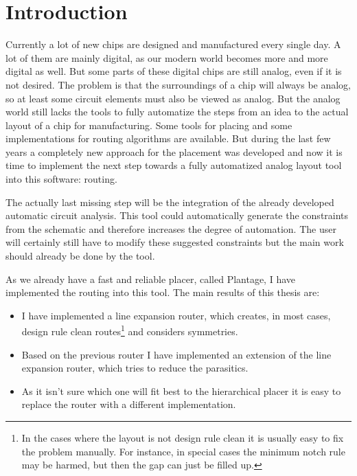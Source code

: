 \chapter{Introduction}

Currently a lot of new chips are designed and manufactured every single day. A lot of them are mainly digital, as our modern world becomes more and more digital as well. But some parts of these digital chips are still analog, even if it is not desired. The problem is that the surroundings of a chip will always be analog, so at least some circuit elements must also be viewed as analog. But the analog world still lacks the tools to fully automatize the steps from an idea to the actual layout of a chip for manufacturing. Some tools for placing and some implementations for routing algorithms are available. But during the last few years a completely new approach for the placement was developed and now it is time to implement the next step towards a fully automatized analog layout tool into this software: routing.

The actually last missing step will be the integration of the already developed automatic circuit analysis. This tool could automatically generate the constraints from the schematic and therefore increases the degree of automation. The user will certainly still have to modify these suggested constraints but the main work should already be done by the tool.

As we already have a fast and reliable placer, called Plantage, I have implemented the routing into this tool. The main results of this thesis are:
\begin{itemize}
\item I have implemented a line expansion router, which creates, in most cases, design rule clean routes\footnote{\label{foot:1}In the cases where the layout is not design rule clean it is usually easy to fix the problem manually. For instance, in special cases the minimum notch rule may be harmed, but then the gap can just be filled up.} and considers symmetries.
\item Based on the previous router I have implemented an extension of the line expansion router, which tries to reduce the parasitics.
\item As it isn't sure which one will fit best to the hierarchical placer it is easy to replace the router with a different implementation.
\end{itemize}